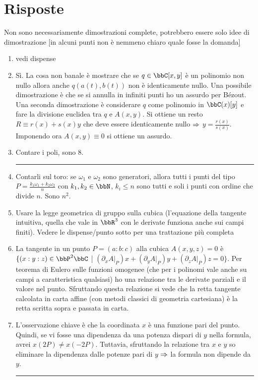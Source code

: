 \section*{Risposte}
Non sono necessariamente dimostrazioni complete, potrebbero essere solo idee di dimostrazione [in alcuni punti non è nemmeno chiaro quale fosse la domanda]
\bigskip
\begin{enumerate}

\item vedi dispense
\item Sì. La cosa non banale è mostrare che se $q\in \bbC[x, y]$ è un polinomio non nullo allora anche $q(a(t), b(t))$ non è identicamente nullo. Una possibile dimostrazione è che se si annulla in infiniti punti ho un assurdo per Bézout. Una seconda dimostrazione è considerare $q$ come polinomio in $\bbC(x)[y]$ e fare la divisione euclidea tra $q$ e $A(x, y)$. Si ottiene un resto $R\equiv r(x)+s(x)y$  che deve essere identicamente nullo $\Rightarrow$ $y=\frac{r(x)}{s(x)}$. Imponendo ora $A(x, y)\equiv 0$ si ottiene un assurdo.
\item Contare i poli, sono 8.
\bigskip
\hrule
\bigskip

\item Contarli sul toro: se $\omega_1$ e $\omega_2$ sono generatori, allora tutti i punti del tipo $P=\frac{k_1 \omega_1 +k_2 \omega_2}{n}$ con $k_1, k_2\in \bbN$, $k_i \leq n$ sono tutti e soli i punti con ordine che divide $n$. Sono $n^2$.
\item Usare la legge geometrica di gruppo sulla cubica (l'equazione della tangente intuitiva, quella che vale in $\bbR^3$ con le derivate funziona anche sui campi finiti). Vedere le dispense/punto sotto per una trattazione più completa
\item La tangente in un punto $P=(a:b:c)$ alla cubica $A(x, y, z)=0$ è $\{ (x:y:z)\in \bbP^2\bbC$ | $ (\partial_x A|_{P})x + (\partial_y A|_{P})y + (\partial_z A|_{P})z=0\}$. Per teorema di Eulero sulle funzioni omogenee (che per i polinomi vale anche su campi a caratteristica qualsiasi) ho una relazione tra le derivate parziali e il valore nel punto. Sfruttando questa relazione si vede che la retta tangente calcolata in carta affine (con metodi classici di geometria cartesiana) è la retta scritta sopra e passata in carta.
\item L'osservazione chiave è che la coordinata $x$ è una funzione pari del punto. Quindi, se vi fosse una dipendenza da una potenza dispari di $y$ nella formula, avrei $x(2P)\neq x(-2P)$. Tuttavia, sfruttando la relazione tra $x$ e $y$ so eliminare la dipendenza dalle potenze pari di $y$ $\Rightarrow$ la formula non dipende da $y$. 
\bigskip
\hrule
\bigskip


\end{enumerate}
